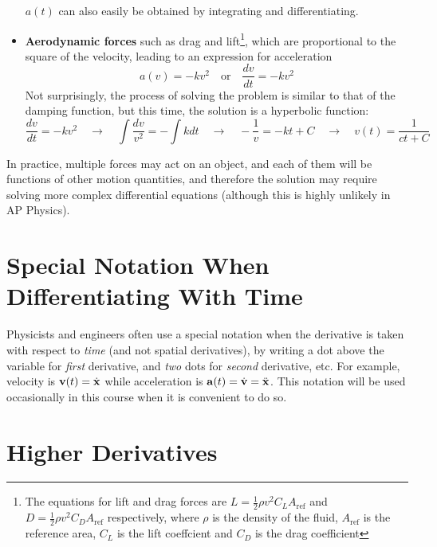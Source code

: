 \documentclass{../../../oss-handout}
\newcommand{\mb}[1]{\ensuremath\mathbf{#1}}
\begin{document}
\begin{itemize}[leftmargin=15pt]
  $a(t)$ can also easily be obtained by integrating and differentiating.
\item\textbf{Aerodynamic forces} such as drag and lift\footnote{The equations
  for lift and drag forces are $L=\frac12\rho v^2C_LA_\mathrm{ref}$ and
  $D=\frac12\rho v^2C_DA_\mathrm{ref}$ respectively, where $\rho$ is the density
  of the fluid, $A_\mathrm{ref}$ is the reference area, $C_L$ is the lift
  coeffcient and $C_D$ is the drag coefficient}, which are proportional
  to the square of the velocity, leading to an expression for acceleration 
  \begin{equation*}
    a(v)=-kv^2\quad\text{or}\quad \frac{dv}{dt}=-kv^2
  \end{equation*}
  Not surprisingly, the process of solving the problem is similar to that of
  the damping function, but this time, the solution is a hyperbolic function:
  \begin{equation*}
    \frac{dv}{dt}=-kv^2\quad\rightarrow\quad \int\frac{dv}{v^2}=-\int kdt
    \quad\rightarrow\quad -\frac{1}{v}=-kt+C
    \quad\rightarrow\quad v(t)=\frac{1}{ct+C}
  \end{equation*}
\end{itemize}
In practice, multiple forces may act on an object, and each of them will be
functions of other motion quantities, and therefore the solution may require
solving more complex differential equations (although this is highly unlikely in
AP Physics).

\section{Special Notation When Differentiating With Time}

Physicists and engineers often use a special notation when the derivative is
taken with respect to \emph{time} (and not spatial derivatives), by writing a
dot above the variable for \emph{first} derivative, and \emph{two} dots for
\emph{second} derivative, etc. For example, velocity is
$\mb{v}(t)=\dot{\mb{x}}$ while acceleration is
$\mb{a}(t)= \dot{\mb{v}}=\ddot{\mb{x}}$. This notation will be used occasionally
in this course when it is convenient to do so.


\section{Higher Derivatives}
\end{document}

